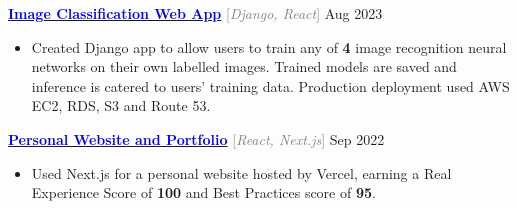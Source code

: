 \documentclass[9pt]{developercv} %
\begin{document}
\begin{minipage}[t]{\textwidth}
	\textbf{\href{https://uclassify.henryhu.dev}{\textcolor{blue}{Image Classification Web App}}} \quad \textcolor{gray}{[\;\textit{Django, React}\;]} \hfill Aug 2023
	\begin{itemize}[noitemsep,topsep=0pt]
		\item Created Django app to allow users to train any of \textbf{4} image recognition neural networks on
		their own labelled images. Trained models are saved and inference is catered to users'
		training data. Production deployment used AWS EC2, RDS, S3 and Route 53.
	\end{itemize}
	\vspace{0.3em}

	\textbf{\href{https://henryhu.dev}{\textcolor{blue}{Personal Website and Portfolio}}} \quad \textcolor{gray}{[\;\textit{React, Next.js}\;]} \hfill Sep 2022
	\begin{itemize}[noitemsep,topsep=0pt]
		\item Used Next.js for a personal website hosted by Vercel, earning a Real Experience Score of \textbf{100} and Best Practices score of \textbf{95}.
	\end{itemize}
	\vspace{0.3em}

\end{minipage}
\end{document}
